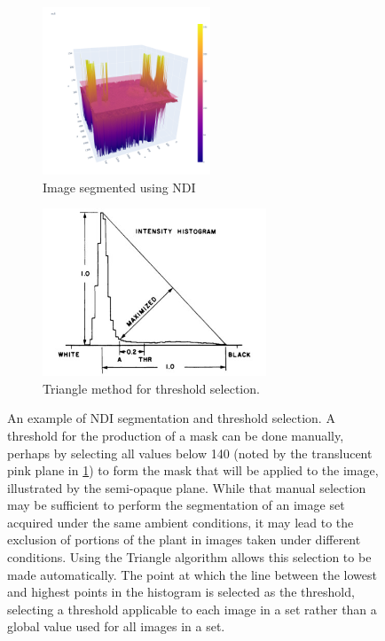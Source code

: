 \documentclass[letterpaper]{article}
\begin{document}
{\begin{figure}[H]
	\centering
	\begin{subfigure}[h]{.48\textwidth}
	  \centering
	  \includegraphics[height=5cm]{./figures/ndi-1-of-2.png}
	  \caption{Image segmented using NDI}
	  \label{fig:ndi-1}
	\end{subfigure}
	\hfill
	\begin{subfigure}[h]{.48\textwidth}
	  \centering
	  \includegraphics[height=5cm]{./figures/triangle-algorithm}
	  \caption{Triangle method for threshold selection.}
	  \label{fig:ndi-2}
	\end{subfigure}
	\caption[NDI segmentation and threshold selection]{An example of NDI segmentation and threshold selection. A threshold for the production of a mask can be done manually, perhaps by selecting all values below 140 (noted by the translucent pink plane in \ref{fig:ndi-1}) to form the mask that will be applied to the image, illustrated by the semi-opaque plane. While that manual selection may be sufficient to perform the segmentation of an image set acquired under the same ambient conditions, it may lead to the exclusion of portions of the plant in images taken under different conditions. Using the Triangle algorithm \parencite{Brink1996-xy,Zack1977-yl} allows this selection to be made automatically. The point at which the line between the lowest and highest points in the histogram is selected as the threshold, selecting a threshold applicable to each image in a set rather than a global value used for all images in a set.}
	\label{fig:ndi-segmentation}
\end{figure}

}
\end{document}
